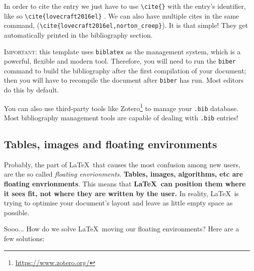 In order to cite the entry we just have to use \verb|\cite{}| with the entry's identifier, like so \verb|\cite{lovecraft2016el}| \cite{lovecraft2016el}. We can also have multiple cites in the same command, \cite{lovecraft2016el,norton_creep} (\verb|\cite{lovecraft2016el,norton_creep}|). It is that simple! They get automatically printed in the bibliography section.

\textsc{\color{red}Important:} this template uses \texttt{biblatex} as the management system, which is a powerful, flexible and modern tool. Therefore, you will need to run the \texttt{biber} command to build the bibliography after the first compilation of your document; then you will have to recompile the document after \texttt{biber} has run. Most editors do this by default.

You can also use third-party tools like Zotero\footnote{\url{https://www.zotero.org/}} to manage your \verb|.bib| database. Most bibliography management tools are capable of dealing with \verb|.bib| entries!

\subsection{Tables, images and floating environments}

Probably, the part of \LaTeX\ that causes the most confusion among new users, are the so called \emph{floating envrionments}. \textbf{Tables, images, algorithms, etc are floating envrionments}. This means that \textbf{\LaTeX\ can position them where it sees fit, not where they are written by the user.} In reality, \LaTeX\ is trying to optimise your document's layout and leave as little empty space as possible.

Sooo... How do we solve \LaTeX\ moving our floating environments? Here are a few solutions:

